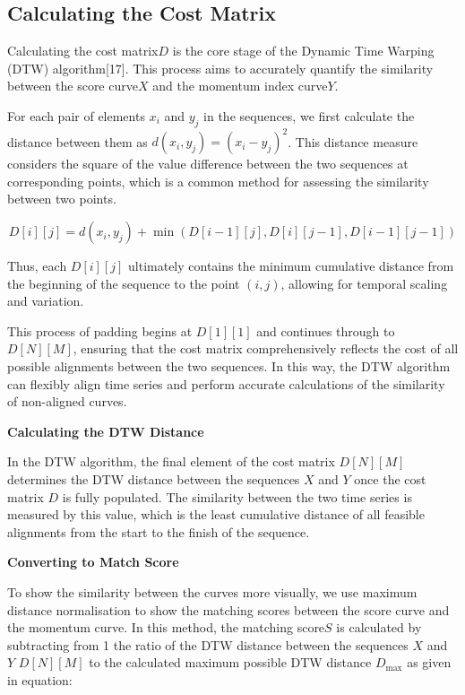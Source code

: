 \documentclass[12pt]{article}  %
\begin{document}
\subsection{Calculating the Cost Matrix}

Calculating the cost matrix\(D\) is the core stage of the Dynamic Time Warping (DTW) algorithm[17]. This process aims to accurately quantify the similarity between the score curve\(X\) and the momentum index curve\(Y\).

For each pair of elements \(x_i\) and \(y_j\) in the sequences, we first calculate the distance between them as \(d(x_i, y_j) = (x_i - y_j)^2\). This distance measure considers the square of the value difference between the two sequences at corresponding points, which is a common method for assessing the similarity between two points.

\begin{equation}
	D[i][j] = d(x_i, y_j) + \min(D[i-1][j], D[i][j-1], D[i-1][j-1])
\end{equation}

Thus, each \(D[i][j]\) ultimately contains the minimum cumulative distance from the beginning of the sequence to the point \((i,j)\), allowing for temporal scaling and variation.

This process of padding begins at \(D[1][1]\) and continues through to \(D[N][M]\), ensuring that the cost matrix comprehensively reflects the cost of all possible alignments between the two sequences. In this way, the DTW algorithm can flexibly align time series and perform accurate calculations of the similarity of non-aligned curves.

\noindent\textbf{Calculating the DTW Distance}

In the DTW algorithm, the final element of the cost matrix \(D[N][M]\) determines the DTW distance between the sequences \(X\) and \(Y\) once the cost matrix \(D\) is fully populated. The similarity between the two time series is measured by this value, which is the least cumulative distance of all feasible alignments from the start to the finish of the sequence.

\noindent\textbf{Converting to Match Score}

To show the similarity between the curves more visually, we use maximum distance normalisation to show the matching scores between the score curve and the momentum curve. In this method, the matching score\(S\) is calculated by subtracting from 1 the ratio of the DTW distance between the sequences \(X\) and \(Y\) \(D[N][M]\) to the calculated maximum possible DTW distance \(D_{\text{max}}\) as given in equation:
\end{document}
